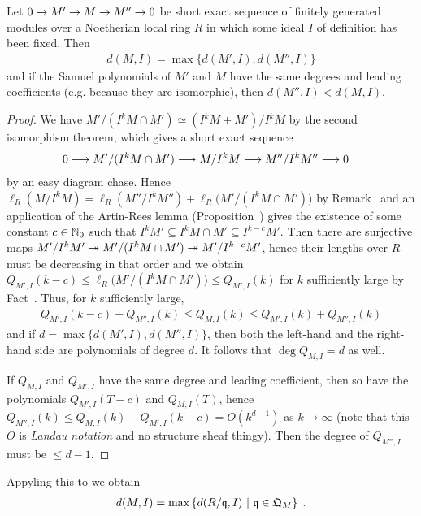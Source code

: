 \documentclass[a4paper,parskip=half,numbers=enddot, DIV=12]{scrreprt}
\begin{document}
\begin{cor}
    Let $0\morphism M'\morphism M \morphism M''\morphism 0$ be short exact sequence of finitely generated modules over a Noetherian local ring $R$ in which some ideal $I$ of definition has been fixed. Then 
    \begin{align*}
    	d(M,I) = \max\{d(M',I), d(M'',I)\}
    \end{align*}
    and if the Samuel polynomials of $M'$ and $M$ have the same degrees and leading coefficients (e.g. because they are isomorphic), then $d(M'',I) < d(M,I)$.
\end{cor}
\begin{proof}
    We have $M'/(I^kM\cap M')\simeq (I^kM+M')/I^kM$ by the second isomorphism theorem, which gives a short exact sequence
    \begin{align*}
        0 &\morphism M'/(I^kM\cap M') \morphism M/I^kM \morphism M''/I^kM'' \morphism 0
    \end{align*}
    by an easy diagram chase. Hence $\ell_R(M/I^kM) = \ell_R(M''/I^kM'') + \ell_R\big(M'/(I^kM\cap M')\big)$ by Remark~ and an application of the Artin-Rees lemma (Proposition~) gives the existence of some constant $c\in \mathbb{N}_0$ such that $I^kM'\subseteq I^kM\cap M'\subseteq I^{k-c}M'$. Then there are surjective maps $M'/I^kM'\epimorphism M'/(I^kM\cap M')\epimorphism M'/I^{k-c}M'$, hence their lengths over $R$ must be decreasing in that order and we obtain $Q_{M',I}(k-c) \leq \ell_R\big(M'/(I^kM\cap M')\big) \leq Q_{M',I}(k)$ for $k$ sufficiently large by Fact~. Thus, for $k$ sufficiently large,
    \begin{align*}
        Q_{M',I}(k-c) + Q_{M'',I}(k) \leq Q_{M,I}(k) \leq Q_{M',I}(k) + Q_{M'',I}(k)
    \end{align*}
    and if $d=\max\{d(M',I), d(M'',I)\}$, then both the left-hand and the right-hand side are polynomials of degree $d$. It follows that $\deg Q_{M,I}=d$ as well.
    
     If $Q_{M,I}$ and $Q_{M',I}$ have the same degree and leading coefficient, then so have the polynomials $Q_{M',I}(T-c)$ and $Q_{M,I}(T)$, hence $Q_{M'',I}(k)\leq Q_{M,I}(k)-Q_{M',I}(k-c)=O(k^{d-1})$ as $k\to\infty$ (note that this $O$ is \emph{Landau notation} and no structure sheaf thingy).
     Then the degree of $Q_{M'',I}$ must be $\leq d-1$.
\end{proof}
\begin{cor}
    Appyling this to  we obtain 
    \begin{align*}
        d(M,I) = \max\left\{d(R/\mathfrak{q},I) \ \middle|\  \mathfrak{q}\in \mathfrak{Q}_M\right\}\;.
    \end{align*}
\end{cor}
\end{document}
